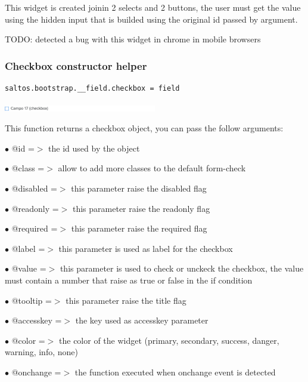 \documentclass[a4paper]{article}
\begin{document}
This widget is created joinin 2 selects and 2 buttons, the user must get the value
using the hidden input that is builded using the original id passed by argument.

TODO: detected a bug with this widget in chrome in mobile browsers

\hypertarget{toc65}{}
\subsubsection{Checkbox constructor helper}

\begin{lstlisting}
saltos.bootstrap.__field.checkbox = field
\end{lstlisting}

\begin{center}\includegraphics[width=0.5\textwidth]{../ujest/snaps/test-bootstrap-js-bootstrap-campo-17-checkbox-1-snap.png}\end{center}

This function returns a checkbox object, you can pass the follow arguments:

\begin{compactitem}
\item[\color{myblue}$\bullet$] @id        =$>$ the id used by the object
\item[\color{myblue}$\bullet$] @class     =$>$ allow to add more classes to the default form-check
\item[\color{myblue}$\bullet$] @disabled  =$>$ this parameter raise the disabled flag
\item[\color{myblue}$\bullet$] @readonly  =$>$ this parameter raise the readonly flag
\item[\color{myblue}$\bullet$] @required  =$>$ this parameter raise the required flag
\item[\color{myblue}$\bullet$] @label     =$>$ this parameter is used as label for the checkbox
\item[\color{myblue}$\bullet$] @value     =$>$ this parameter is used to check or unckeck the checkbox, the value
              must contain a number that raise as true or false in the if condition
\item[\color{myblue}$\bullet$] @tooltip   =$>$ this parameter raise the title flag
\item[\color{myblue}$\bullet$] @accesskey =$>$ the key used as accesskey parameter
\item[\color{myblue}$\bullet$] @color     =$>$ the color of the widget (primary, secondary, success, danger, warning, info, none)
\item[\color{myblue}$\bullet$] @onchange  =$>$ the function executed when onchange event is detected
\end{compactitem}
\end{document}
